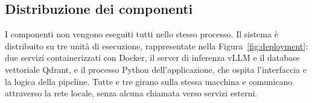 
\subsection*{Distribuzione dei componenti}

I componenti non vengono eseguiti tutti nello stesso processo. Il sistema è distribuito su tre unità di
esecuzione, rappresentate nella Figura~\ref{fig:deployment}: due servizi containerizzati con Docker, il server di
inferenza vLLM e il database vettoriale Qdrant, e il processo Python dell'applicazione, che ospita l'interfaccia e
la logica della pipeline. Tutte e tre girano sulla stessa macchina e comunicano attraverso la rete locale, senza
alcuna chiamata verso servizi esterni.

